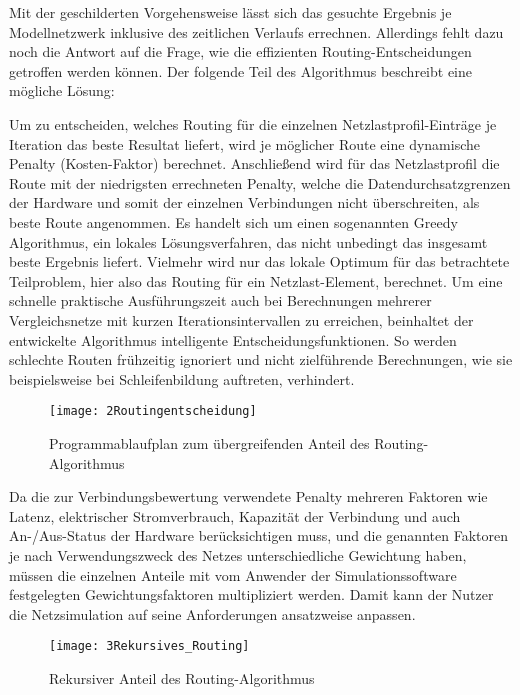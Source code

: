 Mit der geschilderten Vorgehensweise lässt sich das gesuchte Ergebnis je Modellnetzwerk inklusive des zeitlichen Verlaufs errechnen. Allerdings fehlt dazu noch die Antwort auf die Frage, wie die effizienten Routing-Entscheidungen getroffen werden können. Der folgende Teil des Algorithmus beschreibt eine mögliche Lösung:


Um zu entscheiden, welches Routing für die einzelnen Netzlastprofil-Einträge je Iteration das beste Resultat liefert, wird je möglicher Route eine dynamische Penalty (Kosten-Faktor) berechnet. Anschließend wird für das Netzlastprofil die Route mit der niedrigsten errechneten Penalty, welche die Datendurchsatzgrenzen der Hardware und somit der einzelnen Verbindungen nicht überschreiten, als beste Route angenommen. Es handelt sich um einen sogenannten Greedy Algorithmus, ein lokales Lösungsverfahren, das nicht unbedingt das insgesamt beste Ergebnis liefert. Vielmehr wird nur das lokale Optimum für das betrachtete Teilproblem, hier also das Routing für ein Netzlast-Element, berechnet. Um eine schnelle praktische Ausführungszeit auch bei Berechnungen mehrerer Vergleichsnetze mit kurzen Iterationsintervallen zu erreichen, beinhaltet der entwickelte Algorithmus intelligente Entscheidungsfunktionen.  So werden schlechte Routen frühzeitig ignoriert und nicht zielführende Berechnungen, wie sie beispielsweise bei Schleifenbildung auftreten, verhindert.
\begin{figure}[htbp]
	\centering
	\texttt{[image: 2Routingentscheidung]}
	\caption{Programmablaufplan zum übergreifenden Anteil des Routing-Algorithmus}
	\label{fig:2Routingentscheidung}
\end{figure}

Da die zur Verbindungsbewertung verwendete Penalty mehreren Faktoren wie Latenz, elektrischer Stromverbrauch, Kapazität der Verbindung und auch An-/Aus-Status der Hardware berücksichtigen muss, und die genannten Faktoren je nach Verwendungszweck des Netzes unterschiedliche Gewichtung haben, müssen die einzelnen Anteile mit vom Anwender der Simulationssoftware festgelegten Gewichtungsfaktoren multipliziert werden. Damit kann der Nutzer die Netzsimulation auf seine Anforderungen ansatzweise anpassen.
\begin{figure}[htbp]
	\centering
	\texttt{[image: 3Rekursives\_Routing]}
	\caption{Rekursiver Anteil des Routing-Algorithmus}
	\label{fig:3Rekursives_Routing}
\end{figure}


